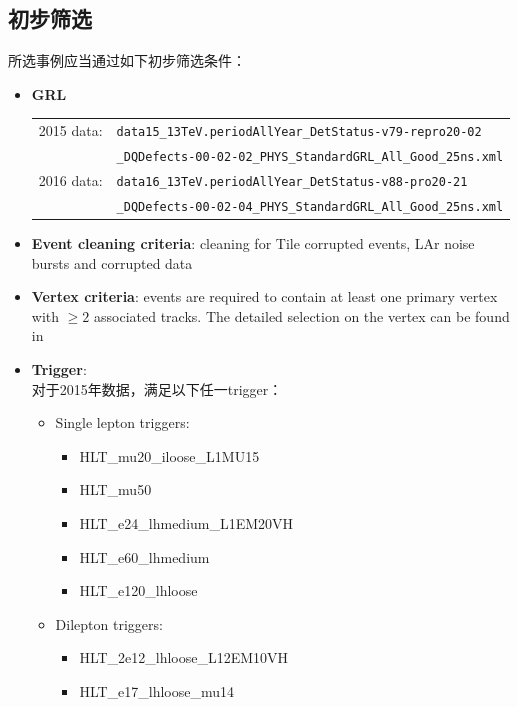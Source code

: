 \subsection{初步筛选}
所选事例应当通过如下初步筛选条件：
\begin{itemize}
  \item \textbf{GRL} \\
	\begin{tabular}{ll}
    2015 data: & {\tt data15\_13TeV.periodAllYear\_DetStatus-v79-repro20-02} \\
                      & {\tt \_DQDefects-00-02-02\_PHYS\_StandardGRL\_All\_Good\_25ns.xml} \\
   2016 data: & {\tt data16\_13TeV.periodAllYear\_DetStatus-v88-pro20-21} \\
                    & {\tt \_DQDefects-00-02-04\_PHYS\_StandardGRL\_All\_Good\_25ns.xml} \\
  \end{tabular}
  \item \textbf{Event cleaning criteria}: cleaning for Tile corrupted events, LAr noise bursts and corrupted data
  \item \textbf{Vertex criteria}: events are required to contain at least one primary vertex with $\ge2$ associated tracks. The detailed selection on the vertex can be found in~\cite{vertex_ref}
  \item \textbf{Trigger}: \\
  对于2015年数据，满足以下任一trigger：
    \begin{itemize}
    \item Single lepton triggers:
    \begin{itemize}
      \item HLT\_mu20\_iloose\_L1MU15
      \item HLT\_mu50
      \item HLT\_e24\_lhmedium\_L1EM20VH
      \item HLT\_e60\_lhmedium
      \item HLT\_e120\_lhloose
    \end{itemize}
    \item Dilepton triggers:
    \begin{itemize}
      \item HLT\_2e12\_lhloose\_L12EM10VH
      \item HLT\_e17\_lhloose\_mu14

\end{itemize}
\end{itemize}
\end{itemize}
